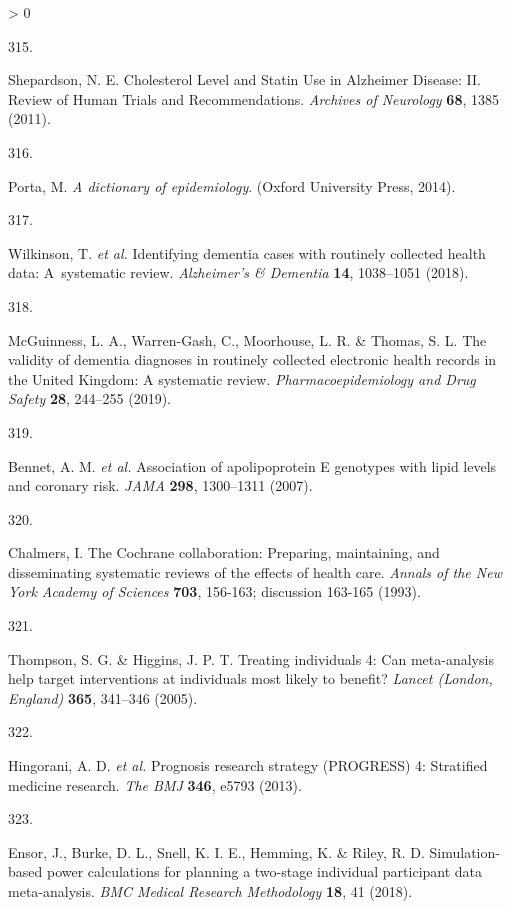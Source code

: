 \documentclass[a4paper, twoside]{templates/ociamthesis}
\newlength{\cslhangindent}
\newlength{\csllabelwidth}
\newenvironment{CSLReferences}[3] %
 {%
  \setlength{\parindent}{0pt}
  \ifodd #1 \everypar{\setlength{\hangindent}{\cslhangindent}}\ignorespaces\fi
  \ifnum #2 > 0
  \setlength{\parskip}{#2\baselineskip}
  \fi
 }%
 {}
\newcommand{\CSLLeftMargin}[1]{\parbox[t]{\maxof{\widthof{#1}}{\csllabelwidth}}{#1}}
\newcommand{\CSLRightInline}[1]{\parbox[t]{\linewidth - \csllabelwidth}{#1}}
\begin{document}
\begin{CSLReferences}{0}{0}
\leavevmode\hypertarget{ref-shepardson2011}{}%
\CSLLeftMargin{315. }
\CSLRightInline{Shepardson, N. E. Cholesterol {Level} and {Statin Use} in {Alzheimer Disease}: {II}. {Review} of {Human Trials} and {Recommendations}. \emph{Archives of Neurology} \textbf{68}, 1385 (2011).}

\leavevmode\hypertarget{ref-porta2014}{}%
\CSLLeftMargin{316. }
\CSLRightInline{Porta, M. \emph{A dictionary of epidemiology}. ({Oxford University Press}, 2014).}

\leavevmode\hypertarget{ref-wilkinson2018}{}%
\CSLLeftMargin{317. }
\CSLRightInline{Wilkinson, T. \emph{et al.} Identifying dementia cases with routinely collected health data: A~systematic review. \emph{Alzheimer's \& Dementia} \textbf{14}, 1038--1051 (2018).}

\leavevmode\hypertarget{ref-mcguinness2019validity}{}%
\CSLLeftMargin{318. }
\CSLRightInline{McGuinness, L. A., Warren-Gash, C., Moorhouse, L. R. \& Thomas, S. L. The validity of dementia diagnoses in routinely collected electronic health records in the {United Kingdom}: A systematic review. \emph{Pharmacoepidemiology and Drug Safety} \textbf{28}, 244--255 (2019).}

\leavevmode\hypertarget{ref-bennet2007}{}%
\CSLLeftMargin{319. }
\CSLRightInline{Bennet, A. M. \emph{et al.} Association of apolipoprotein {E} genotypes with lipid levels and coronary risk. \emph{JAMA} \textbf{298}, 1300--1311 (2007).}

\leavevmode\hypertarget{ref-chalmers1993}{}%
\CSLLeftMargin{320. }
\CSLRightInline{Chalmers, I. The {Cochrane} collaboration: Preparing, maintaining, and disseminating systematic reviews of the effects of health care. \emph{Annals of the New York Academy of Sciences} \textbf{703}, 156-163; discussion 163-165 (1993).}

\leavevmode\hypertarget{ref-thompson2005}{}%
\CSLLeftMargin{321. }
\CSLRightInline{Thompson, S. G. \& Higgins, J. P. T. Treating individuals 4: Can meta-analysis help target interventions at individuals most likely to benefit? \emph{Lancet (London, England)} \textbf{365}, 341--346 (2005).}

\leavevmode\hypertarget{ref-hingorani2013}{}%
\CSLLeftMargin{322. }
\CSLRightInline{Hingorani, A. D. \emph{et al.} Prognosis research strategy ({PROGRESS}) 4: Stratified medicine research. \emph{The BMJ} \textbf{346}, e5793 (2013).}

\leavevmode\hypertarget{ref-ensor2018}{}%
\CSLLeftMargin{323. }
\CSLRightInline{Ensor, J., Burke, D. L., Snell, K. I. E., Hemming, K. \& Riley, R. D. Simulation-based power calculations for planning a two-stage individual participant data meta-analysis. \emph{BMC Medical Research Methodology} \textbf{18}, 41 (2018).}


\end{CSLReferences}
\end{document}
